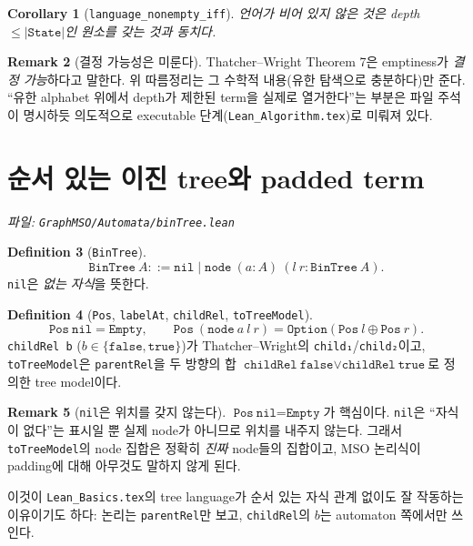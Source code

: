 \documentclass[11pt]{article}
\theoremstyle{definition}
\newtheorem{definition}{Definition}[section]
\newtheorem{remark}[definition]{Remark}
\theoremstyle{plain}
\newtheorem{corollary}[definition]{Corollary}
\newcommand{\MSO}{\mathrm{MSO}}
\newcommand{\lean}[1]{\texttt{#1}}
\newcommand{\leanfile}[1]{\texttt{#1}}
\newcommand{\TW}{Thatcher--Wright}
\begin{document}
\begin{corollary}[\lean{language\_nonempty\_iff}]
\label{aut:cor:emptiness}
언어가 비어 있지 않은 것은 depth $\le |\lean{State}|$인 원소를 갖는 것과
동치다.
\end{corollary}

\begin{remark}[결정 가능성은 미룬다]
\TW{} Theorem 7은 emptiness가 \emph{결정 가능}하다고 말한다. 위 따름정리는
그 수학적 내용(유한 탐색으로 충분하다)만 준다. ``유한 alphabet 위에서 depth가
제한된 term을 실제로 열거한다''는 부분은 파일 주석이 명시하듯 의도적으로
executable 단계(\leanfile{Lean\_Algorithm.tex})로 미뤄져 있다.
\end{remark}

\section{순서 있는 이진 tree와 padded term}
\label{aut:sec:bintree}

\emph{파일: \leanfile{GraphMSO/Automata/binTree.lean}}

\begin{definition}[\lean{BinTree}]
\label{aut:def:bintree}
\[
  \lean{BinTree}\ A ::= \lean{nil} \mid \lean{node}\ (a : A)\ (l\ r : \lean{BinTree}\ A).
\]
\lean{nil}은 \emph{없는 자식}을 뜻한다.
\end{definition}

\begin{definition}[\lean{Pos}, \lean{labelAt}, \lean{childRel}, \lean{toTreeModel}]
\label{aut:def:bintreepos}
\[
  \lean{Pos}\ \lean{nil} = \lean{Empty}, \qquad
  \lean{Pos}\ (\lean{node}\ a\ l\ r) = \lean{Option}(\lean{Pos}\ l \oplus \lean{Pos}\ r).
\]
\lean{childRel b} ($b \in \{\lean{false}, \lean{true}\}$)가 \TW{}의
\lean{child₁}/\lean{child₂}이고,
\lean{toTreeModel}은 \lean{parentRel}을 두 방향의 합
$\lean{childRel}\ \lean{false} \lor \lean{childRel}\ \lean{true}$로 정의한
tree model이다.
\end{definition}

\begin{remark}[\lean{nil}은 위치를 갖지 않는다]
\label{aut:rem:nilnopos}
$\lean{Pos}\ \lean{nil} = \lean{Empty}$가 핵심이다. \lean{nil}은 ``자식이
없다''는 표시일 뿐 실제 node가 아니므로 위치를 내주지 않는다. 그래서
\lean{toTreeModel}의 node 집합은 정확히 \emph{진짜} node들의 집합이고,
$\MSO$ 논리식이 padding에 대해 아무것도 말하지 않게 된다.

이것이 \leanfile{Lean\_Basics.tex}의 tree language가 순서 있는 자식 관계
없이도 잘 작동하는 이유이기도 하다: 논리는 \lean{parentRel}만 보고,
\lean{childRel}의 $b$는 automaton 쪽에서만 쓰인다.
\end{remark}
\end{document}
